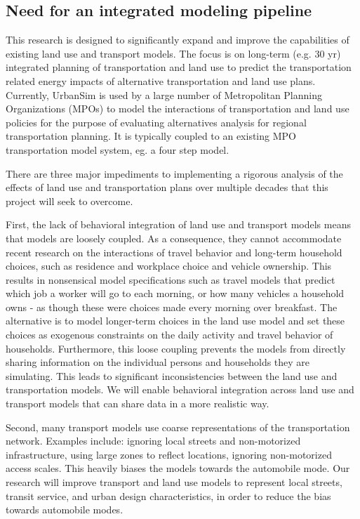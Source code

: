 \subsection{Need for an integrated modeling pipeline}


This research is designed to significantly expand and improve the capabilities of existing land use and transport models. The focus is on long-term (e.g. 30 yr) integrated planning of transportation and land use to predict the transportation related energy impacts of alternative transportation and land use plans. Currently, UrbanSim  is used by a large number of Metropolitan Planning Organizations (MPOs) to model the interactions of transportation and land use policies for the purpose of evaluating alternatives analysis for regional transportation planning. It is typically coupled to an existing MPO transportation model system, eg. a four step model.  

There are three major impediments to implementing a rigorous analysis of the effects of land use and transportation plans over multiple decades that this project will seek to overcome.

First, the lack of behavioral integration of land use and transport models means that models are loosely coupled.  As a consequence, they cannot accommodate  recent research on the interactions of travel behavior and long-term household choices, such as residence and workplace choice and vehicle ownership.  This results in nonsensical model specifications such as travel models that predict which job a worker will go to each morning, or how many vehicles a household owns - as though these were choices made every morning over breakfast.  The alternative is to model longer-term choices in the land use model and set these choices as exogenous constraints on the daily activity and travel behavior of households.  Furthermore, this loose coupling prevents the models from directly sharing information on the individual persons and households they are simulating. This leads to significant inconsistencies between the land use and transportation models.  We will enable behavioral integration across land use and transport models  that can share data in a more realistic way.

Second, many transport models use coarse representations of the transportation network. Examples include: ignoring local streets and non-motorized infrastructure, using large zones to reflect locations, ignoring non-motorized access scales. This heavily biases the models towards the automobile mode.  Our research will improve transport and land use models to represent local streets, transit service, and urban design characteristics, in order to reduce the bias towards automobile modes.

